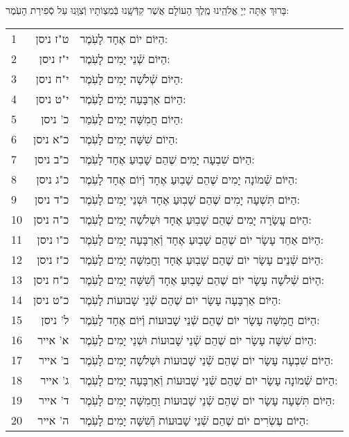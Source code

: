 \documentclass[twoside, openany, parskip=half, 11pt]{book}
\begin{document}
בָּרוּךְ אַתָּה יְיָ אֱלֹהֵֽינוּ מֶֽלֶךְ הָעוֹלָם אֲשֶׁר קִדְּֿשָֽׁנוּ בְּֿמִצְוֹתָיו וְֿצִוָּֽנוּ עַל סְֿפִירַת הָעֹֽמֶר:\\

\begin{scriptsize}
\begin{longtable}{ l | r | p{} }
1 & ט"ז ניסן & הַיּוֹם יוֹם אֶחָד לָעֹֽמֶר: \\
2 & י"ז ניסן & הַיּוֹם שְֿׁנֵי יָמִים לָעֹֽמֶר: \\
3 & י"ח ניסן & הַיּוֹם שְֿׁלֹשָׁה יָמִים לָעֹֽמֶר: \\
4 & י"ט ניסן & הַיּוֹם אַרְבָּעָה יָמִים לָעֹֽמֶר: \\
5 & כ' ניסן & הַיּוֹם חֲמִשָּׁה יָמִים לָעֹֽמֵר: \\
6 & כ"א ניסן & הַיוֹם שִׁשָּׁה יָמִים לָעֹֽמֶר: \\
7 & כ"ב ניסן & הַיּוֹם שִׁבְעָה יָמִים שֶׁהֵם שָׁבֽוּעַ אֶחָד לָעֹֽמֶר: \\
8 & כ"ג ניסן & הַיּוֹם שְֿׁמוֹנָה יָמִים שֶׁהֵם שָׁבֽוּעַ אֶחָד וְֿיוֹם אֶחָד לָעֹֽמֶר: \\
9 & כ"ד ניסן & הַיּוֹם תִּשְׁעָה יָמִים שֶׁהֵם שָׁבֽוּעַ אֶחָד וּשְׁנֵי יָמִים לָעֹֽמֶר: \\
10 & כ"ה ניסן & הַיּוֹם עֲשָׂרָה יָמִים שֶׁהֵם שָׁבֽוּעַ אֶחָד וּשְׁלֹשָׁה יָמִים לָעֹֽמֶר: \\
11 & כ"ו ניסן & הַיּוֹם אַחַד עָשָׂר יוֹם שֶׁהֵם שָׁבֽוּעַ אֶחָד וְֿאַרְבָּעָה יָמִים לָעֹֽמֶר: \\
12 & כ"ז ניסן & הַיּוֹם שְֿׁנֵים עָשָׂר יוֹם שֶׁהֵם שָׁבֽוּעַ אֶחָד וַחֲמִשָּׁה יָמִים לָעֹֽמֶר: \\
13 & כ"ח ניסן & הַיּוֹם שְֿׁלֹשָׁה עָשָׂר יוֹם שֶׁהֵם שָׁבֽוּעַ אֶחָד וְֿשִׁשָּׁה יָמִים לָעֹֽמֶר: \\
14 & כ"ט ניסן & הַיּוֹם אַרְבָּעָה עָשָׂר יוֹם שֶׁהֵם שְֿׁנֵי שָׁבוּעוֹת לָעֹֽמֶר: \\
15 & ל' ניסן & הַיּוֹם חֲמִשָּׁה עָשָׂר יוֹם שֶׁהֵם שְֿׁנֵי שָׁבוּעוֹת וְֿיוֹם אֶחָד לָעֹֽמֶר: \\
16 & א' אייר & הַיּוֹם שִׁשָּׁה עָשָׂר יוֹם שֶׁהֵם שְֿׁנֵי שָׁבוּעוֹת וּשְׁנֵי יָמִים לָעֹֽמֶר: \\
17 & ב' אייר & הַיּוֹם שִׁבְעָה עָשָׂר יוֹם שֶׁהֵם שְֿׁנֵי שָׁבוּעוֹת וּשְׁלֹשָׁה יָמִים לָעֹֽמֶר: \\
18 & ג' אייר & הַיּוֹם שְֿׁמוֹנָה עָשָׂר יוֹם שֶׁהֵם שְֿׁנֵי שָׁבוּעוֹת וְֿאַרְבָּעָה יָמִים לָעֹֽמֶר: \\
19 & ד' אייר & הַיּוֹם תִּשְׁעָה עָשָׂר יוֹם שֶׁהֵם שְֿׁנֵי שָׁבוּעוֹת וַחֲמִשָּׁה יָמִים לָעֹֽמֶר: \\
20 & ה' אייר & הַיּוֹם עֶשְׂרִים יוֹם שֶׁהֵם שְֿׁנֵי שָׁבוּעוֹת וְֿשִׁשָּׁה יָמִים לָעֹֽמֶר: \\

\end{longtable}
\end{scriptsize}
\end{document}
